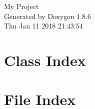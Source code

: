 \documentclass[twoside]{book}
\newcommand{\clearemptydoublepage}{%
  \newpage{\pagestyle{empty}\cleardoublepage}%
}
\begin{document}
\hypersetup{pageanchor=false}
\begin{titlepage}
\vspace*{7cm}
\begin{center}%
{\Large My Project }\\
\vspace*{1cm}
{\large Generated by Doxygen 1.8.6}\\
\vspace*{0.5cm}
{\small Thu Jan 11 2018 21:43:54}\\
\end{center}
\end{titlepage}
\clearemptydoublepage
\tableofcontents
\clearemptydoublepage
{}
\hypersetup{pageanchor=true}

\chapter{Class Index}

\chapter{File Index}

\end{document}
